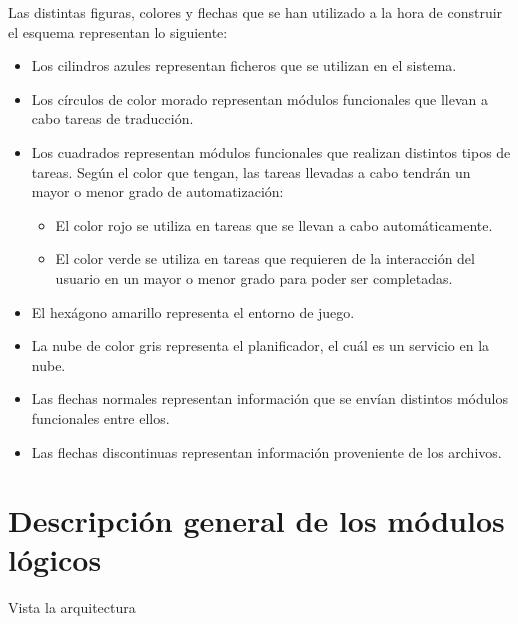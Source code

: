Las distintas figuras, colores y flechas que se han utilizado a la hora de construir el
esquema representan lo siguiente:

\begin{itemize}[label=\textbullet]
    \item Los cilindros azules representan ficheros que se utilizan en el sistema.
    \item Los círculos de color morado representan módulos funcionales que llevan a cabo
    tareas de traducción.
    \item Los cuadrados representan módulos funcionales que realizan distintos tipos de
    tareas. Según el color que tengan, las tareas llevadas a cabo tendrán un mayor o menor
    grado de automatización:
    \begin{itemize}[label=\textendash]
        \item El color rojo se utiliza en tareas que se llevan a cabo automáticamente.
        \item El color verde se utiliza en tareas que requieren de la interacción del usuario
        en un mayor o menor grado para poder ser completadas.
    \end{itemize}
    \item El hexágono amarillo representa el entorno de juego.
    \item La nube de color gris representa el planificador, el cuál es un servicio en la
    nube.
    \item Las flechas normales representan información que se envían distintos módulos
    funcionales entre ellos.
    \item Las flechas discontinuas representan información proveniente de los archivos.
\end{itemize}


\section{Descripción general de los módulos lógicos}

Vista la arquitectura 